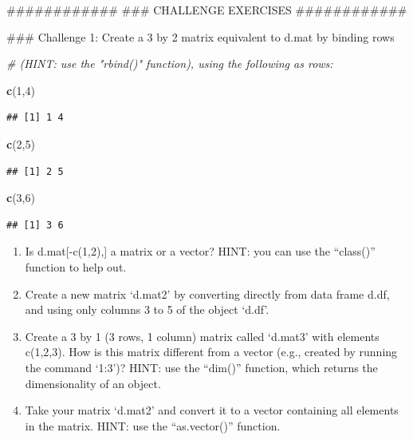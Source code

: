 \documentclass[]{article}
\newenvironment{Shaded}{\begin{snugshade}}{\end{snugshade}}
\newcommand{\KeywordTok}[1]{\textcolor[rgb]{0.13,0.29,0.53}{\textbf{#1}}}
\newcommand{\DecValTok}[1]{\textcolor[rgb]{0.00,0.00,0.81}{#1}}
\newcommand{\CommentTok}[1]{\textcolor[rgb]{0.56,0.35,0.01}{\textit{#1}}}
\newcommand{\NormalTok}[1]{#1}
\begin{document}
\begin{Shaded}
\begin{Highlighting}[]
\NormalTok{############}
\NormalTok{### CHALLENGE EXERCISES}
\NormalTok{############}

\NormalTok{### Challenge 1: Create a 3 by 2 matrix equivalent to d.mat by binding rows }

\CommentTok{# (HINT: use the "rbind()" function), using the following as rows:}

\KeywordTok{c}\NormalTok{(}\DecValTok{1}\NormalTok{,}\DecValTok{4}\NormalTok{) }
\end{Highlighting}
\end{Shaded}

\begin{verbatim}
## [1] 1 4
\end{verbatim}

\begin{Shaded}
\begin{Highlighting}[]
\KeywordTok{c}\NormalTok{(}\DecValTok{2}\NormalTok{,}\DecValTok{5}\NormalTok{) }
\end{Highlighting}
\end{Shaded}

\begin{verbatim}
## [1] 2 5
\end{verbatim}

\begin{Shaded}
\begin{Highlighting}[]
\KeywordTok{c}\NormalTok{(}\DecValTok{3}\NormalTok{,}\DecValTok{6}\NormalTok{)}
\end{Highlighting}
\end{Shaded}

\begin{verbatim}
## [1] 3 6
\end{verbatim}

\begin{enumerate}
\def\labelenumi{\arabic{enumi}.}
\setcounter{enumi}{1}
\item
  Is d.mat{[}-c(1,2),{]} a matrix or a vector? HINT: you can use the
  ``class()'' function to help out.
\item
  Create a new matrix `d.mat2' by converting directly from data frame
  d.df, and using only columns 3 to 5 of the object `d.df'.
\item
  Create a 3 by 1 (3 rows, 1 column) matrix called `d.mat3' with
  elements c(1,2,3). How is this matrix different from a vector (e.g.,
  created by running the command `1:3')? HINT: use the ``dim()''
  function, which returns the dimensionality of an object.
\item
  Take your matrix `d.mat2' and convert it to a vector containing all
  elements in the matrix. HINT: use the ``as.vector()'' function.
\end{enumerate}
\end{document}

